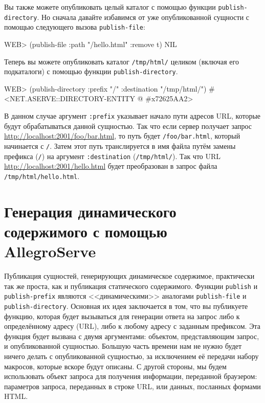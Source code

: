Вы также можете опубликовать целый каталог с помощью функции \lstinline{publish-directory}. Но
сначала давайте избавимся от уже опубликованной сущности с помощью следующего вызова
\lstinline{publish-file}:

\begin{myverb}
WEB> (publish-file :path "/hello.html" :remove t)
NIL
\end{myverb}

Теперь вы можете опубликовать каталог \lstinline{/tmp/html/} целиком (включая его подкаталоги)
с помощью функции \lstinline{publish-directory}.

\begin{myverb}
WEB> (publish-directory :prefix "/" :destination "/tmp/html/")
#<NET.ASERVE::DIRECTORY-ENTITY @ #x72625AA2>
\end{myverb}

В данном случае аргумент \lstinline{:prefix} указывает начало пути адресов URL, которые будут
обрабатываться данной сущностью. Так что если сервер получает запрос
\url{http://localhost:2001/foo/bar.html}, то путь будет \lstinline{/foo/bar.html}, который
начинается с \lstinline{/}. Затем этот путь транслируется в имя файла путём замены префикса
(\lstinline{/}) на аргумент \lstinline{:destination} (\lstinline{/tmp/html/}). Так что URL
\url{http://localhost:2001/hello.html} будет преобразован в запрос файла
\lstinline{/tmp/html/hello.html}.

\section{Генерация динамического содержимого с помощью AllegroServe}

Публикация сущностей, генерирующих динамическое содержимое, практически так же проста, как
и публикация статического содержимого. Функции \lstinline{publish} и \lstinline{publish-prefix}
являются <<динамическими>> аналогами \lstinline{publish-file} и
\lstinline{publish-directory}. Основная их идея заключается в том, что вы публикуете функцию,
которая будет вызываться для генерации ответа на запрос либо к определённому адресу
(URL), либо к любому адресу с заданным префиксом. Эта функция будет вызвана с двумя
аргументами: объектом, представляющим запрос, и опубликованной сущностью. Большую часть
времени нам не нужно будет ничего делать с опубликованной сущностью, за исключением её
передачи набору макросов, которые вскоре будут описаны. С другой стороны, мы будем
использовать объект запроса для получения информации, переданной браузером: параметров
запроса, переданных в строке URL, или данных, посланных формами HTML.

